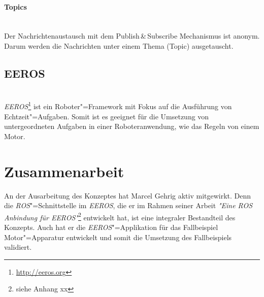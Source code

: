 \paragraph*{Topics} \mbox{}\\
Der Nachrichtenaustausch mit dem Publish\,\&\,Subscribe Mechanismus ist anonym.
Darum werden die Nachrichten unter einem Thema (Topic) ausgetauscht.

\subsection{EEROS} \mbox{}\\
\textit{EEROS}\footnote{\url{http://eeros.org}} ist ein Roboter"=Framework mit Fokus auf die Ausführung von Echtzeit"=Aufgaben.
Somit ist es geeignet für die Umsetzung von untergeordneten Aufgaben in einer Roboteranwendung, wie das Regeln von einem Motor.


\section{Zusammenarbeit}
An der Ausarbeitung des Konzeptes hat Marcel Gehrig aktiv mitgewirkt.
Denn die \textit{ROS}"=Schnittstelle im \textit{EEROS}, die er im Rahmen seiner Arbeit \textit{\textit{"}Eine ROS Anbindung für EEROS\textit{"}}\footnote{siehe Anhang xx} entwickelt hat, ist eine integraler Bestandteil des Konzepts.
Auch hat er die \textit{EEROS}"=Applikation für das Fallbeispiel Motor"=Apparatur entwickelt und somit die Umsetzung des Fallbeispiels validiert.
